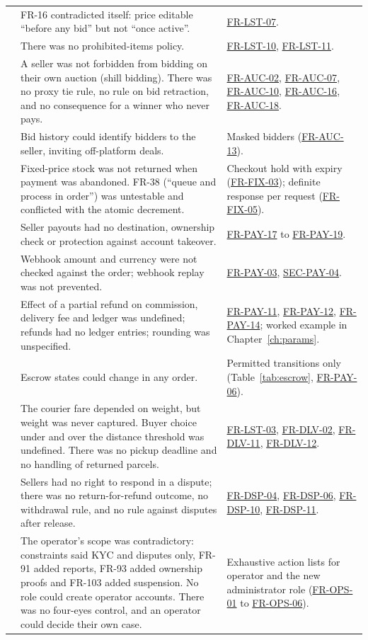 \documentclass[11pt,a4paper]{report}
\newcommand{\rr}[1]{\hyperlink{#1}{#1}}
\begin{document}
{\begin{longtable}{@{}>{\raggedleft\arraybackslash}p{0.5cm} >{\raggedright\arraybackslash}p{7.3cm} >{\raggedright\arraybackslash}p{6.8cm}@{}}
8 & FR-16 contradicted itself: price editable ``before any bid'' but not ``once active''. & \rr{FR-LST-07}. \\
9 & There was no prohibited-items policy. & \rr{FR-LST-10}, \rr{FR-LST-11}. \\
10 & A seller was not forbidden from bidding on their own auction (shill bidding). There was no proxy tie rule, no rule on bid retraction, and no consequence for a winner who never pays. & \rr{FR-AUC-02}, \rr{FR-AUC-07}, \rr{FR-AUC-10}, \rr{FR-AUC-16}, \rr{FR-AUC-18}. \\
11 & Bid history could identify bidders to the seller, inviting off-platform deals. & Masked bidders (\rr{FR-AUC-13}). \\
12 & Fixed-price stock was not returned when payment was abandoned. FR-38 (``queue and process in order'') was untestable and conflicted with the atomic decrement. & Checkout hold with expiry (\rr{FR-FIX-03}); definite response per request (\rr{FR-FIX-05}). \\
13 & Seller payouts had no destination, ownership check or protection against account takeover. & \rr{FR-PAY-17} to \rr{FR-PAY-19}. \\
14 & Webhook amount and currency were not checked against the order; webhook replay was not prevented. & \rr{FR-PAY-03}, \rr{SEC-PAY-04}. \\
15 & Effect of a partial refund on commission, delivery fee and ledger was undefined; refunds had no ledger entries; rounding was unspecified. & \rr{FR-PAY-11}, \rr{FR-PAY-12}, \rr{FR-PAY-14}; worked example in Chapter~\ref{ch:params}. \\
16 & Escrow states could change in any order. & Permitted transitions only (Table~\ref{tab:escrow}, \rr{FR-PAY-06}). \\
17 & The courier fare depended on weight, but weight was never captured. Buyer choice under and over the distance threshold was undefined. There was no pickup deadline and no handling of returned parcels. & \rr{FR-LST-03}, \rr{FR-DLV-02}, \rr{FR-DLV-11}, \rr{FR-DLV-12}. \\
18 & Sellers had no right to respond in a dispute; there was no return-for-refund outcome, no withdrawal rule, and no rule against disputes after release. & \rr{FR-DSP-04}, \rr{FR-DSP-06}, \rr{FR-DSP-10}, \rr{FR-DSP-11}. \\
19 & The operator's scope was contradictory: constraints said KYC and disputes only, FR-91 added reports, FR-93 added ownership proofs and FR-103 added suspension. No role could create operator accounts. There was no four-eyes control, and an operator could decide their own case. & Exhaustive action lists for operator and the new administrator role (\rr{FR-OPS-01} to \rr{FR-OPS-06}). \\

\end{longtable}}
\end{document}

